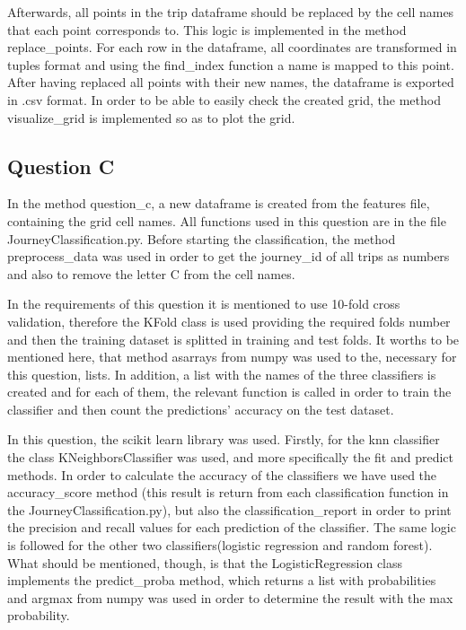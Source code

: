 \documentclass[12pt]{article}
\begin{document}
	Afterwards, all points in the trip dataframe should be replaced by the cell names that each point corresponds to. This logic is implemented in the method replace\_points. For each row in the dataframe, all coordinates are transformed in tuples format and using the find\_index function a name is mapped to this point. After having replaced all points with their new names, the dataframe is exported in .csv format. In order to be able to easily check the created grid, the method visualize\_grid is implemented so as to plot the grid. 
	
	\subsection{Question C}
	In the method question\_c, a new dataframe is created from the features file, containing the grid cell names. All functions used in this question are in the file JourneyClassification.py. Before starting the classification, the method preprocess\_data was used in order to get the journey\_id of all trips as numbers and also to remove the letter C from the cell names.
	
	In the requirements of this question it is mentioned to use 10-fold cross validation, therefore the KFold class is used providing the required folds number and then the training dataset is splitted in training and test folds. It worths to be mentioned here, that method asarrays from numpy was used to the, necessary for this question, lists. In addition, a list with the names of the three classifiers is created and for each of them, the relevant function is called in order to train the classifier and then count the predictions' accuracy on the test dataset. 
	
	In this question, the scikit learn library was used. Firstly, for the knn classifier the class KNeighborsClassifier was used, and more specifically the fit and predict methods. In order to calculate the accuracy of the classifiers we have used the accuracy\_score method (this result is return from each classification function in the JourneyClassification.py), but also the classification\_report in order to print the precision and recall values for each prediction of the classifier. The same logic is followed for the other two classifiers(logistic regression and random forest). What should be mentioned, though, is that the LogisticRegression class implements the predict\_proba method, which returns a list with probabilities and argmax from numpy was used in order to determine the result with the max probability.
	
\end{document}
